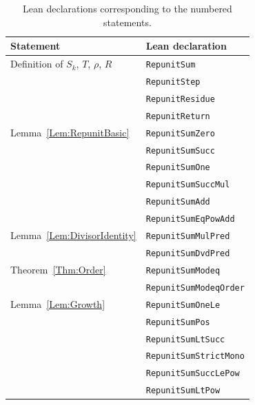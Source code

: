 \documentclass[11pt,letterpaper]{article}
\begin{document}
\begin{table}[htbp]
\centering
\begin{tabular}{ll}
\toprule
Statement & Lean declaration \\
\midrule
Definition of \(S_k\), \(T\), \(\rho\), \(R\) & \texttt{RepunitSum} \\
 & \texttt{RepunitStep} \\
 & \texttt{RepunitResidue} \\
 & \texttt{RepunitReturn} \\
Lemma~\ref{Lem:RepunitBasic} & \texttt{RepunitSumZero} \\
 & \texttt{RepunitSumSucc} \\
 & \texttt{RepunitSumOne} \\
 & \texttt{RepunitSumSuccMul} \\
 & \texttt{RepunitSumAdd} \\
 & \texttt{RepunitSumEqPowAdd} \\
Lemma~\ref{Lem:DivisorIdentity} & \texttt{RepunitSumMulPred} \\
 & \texttt{RepunitSumDvdPred} \\
Theorem~\ref{Thm:Order} & \texttt{RepunitSumModeq} \\
 & \texttt{RepunitSumModeqOrder} \\
Lemma~\ref{Lem:Growth} & \texttt{RepunitSumOneLe} \\
 & \texttt{RepunitSumPos} \\
 & \texttt{RepunitSumLtSucc} \\
 & \texttt{RepunitSumStrictMono} \\
 & \texttt{RepunitSumSuccLePow} \\
 & \texttt{RepunitSumLtPow} \\
\bottomrule
\end{tabular}
\caption{Lean declarations corresponding to the numbered statements.}
\end{table}
\end{document}
